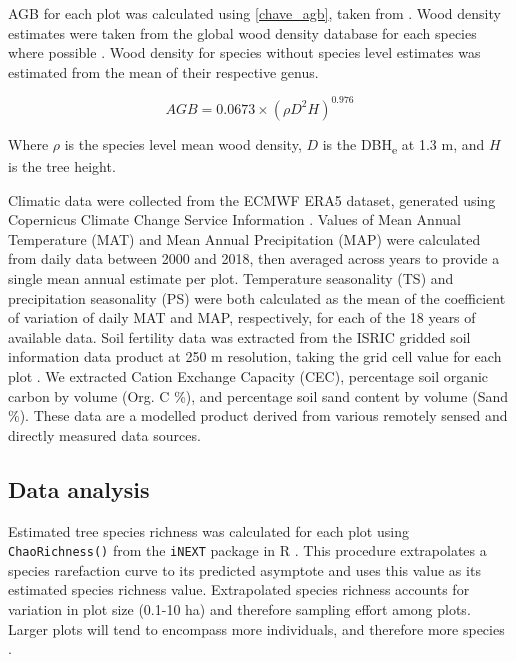 \documentclass[11pt,a4paper]{article}
\begin{document}
AGB for each plot was calculated using \autoref{chave_agb}, taken from \citet{Chave2014}. Wood density estimates were taken from the global wood density database for each species where possible \citep{Chave2009, Zanne2009}. Wood density for species without species level estimates was estimated from the mean of their respective genus. 

\begin{equation}
	AGB = 0.0673 \times (\rho D^{2} H)^{0.976}
	\label{chave_agb}
\end{equation}

Where $\rho$ is the species level mean wood density, $D$ is the DBH\textsubscript{e} at 1.3 m, and $H$ is the tree height.

Climatic data were collected from the ECMWF ERA5 dataset, generated using Copernicus Climate Change Service Information \citep{ERA5}. Values of Mean Annual Temperature (MAT) and Mean Annual Precipitation (MAP) were calculated from daily data between 2000 and 2018, then averaged across years to provide a single mean annual estimate per plot. Temperature seasonality (TS) and precipitation seasonality (PS) were both calculated as the mean of the coefficient of variation of daily MAT and MAP, respectively, for each of the 18 years of available data. Soil fertility data was extracted from the ISRIC gridded soil information data product at 250 m resolution, taking the grid cell value for each plot \citep{Hengl2017}. We extracted Cation Exchange Capacity (CEC), percentage soil organic carbon by volume (Org. C \%), and percentage soil sand content by volume (Sand \%). These data are a modelled product derived from various remotely sensed and directly measured data sources. 

% 
% 

\subsection{Data analysis}
Estimated tree species richness was calculated for each plot using \verb|ChaoRichness()| from the \verb|iNEXT| package in R \citep{Hsieh2016}. This procedure extrapolates a species rarefaction curve to its predicted asymptote and uses this value as its estimated species richness value. Extrapolated species richness accounts for variation in plot size (0.1-10 ha) and therefore sampling effort among plots. Larger plots will tend to encompass more individuals, and therefore more species \citep{Dengler2009}.
\end{document}
